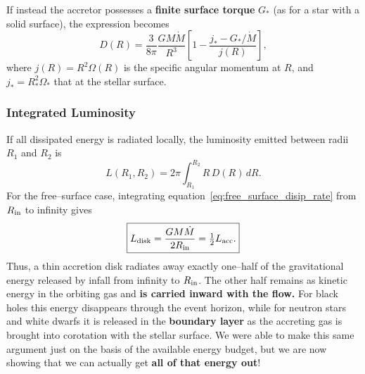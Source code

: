 \vspace{0.3cm}
\noindent
If instead the accretor possesses a \textbf{finite surface torque} $G_*$ (as for a star with a solid surface), 
the expression becomes
\begin{equation}
    D(R) = \frac{3}{8\pi}\frac{GM\dot{M}}{R^3}
    \left[1 - \frac{j_* - G_*/\dot{M}}{j(R)}\right],
\end{equation}
where $j(R)=R^2\Omega(R)$ is the specific angular momentum at $R$, and 
$j_*=R_*^2\Omega_*$ that at the stellar surface.
\vspace{0.4cm}
\subsubsection*{Integrated Luminosity}
If all dissipated energy is radiated locally, the luminosity emitted between radii $R_1$ and $R_2$ is
\begin{equation}
    L(R_1,R_2) = 2\pi \int_{R_1}^{R_2} R\,D(R)\,dR.
\end{equation}
For the free--surface case, integrating equation~\eqref{eq:free_surface_disip_rate} from 
$R_{\rm in}$ to infinity gives
\begin{equation}
    \label{L_disk}
    \boxed{
    L_{\rm disk} = \frac{GM\dot{M}}{2R_{\rm in}} = \tfrac{1}{2}L_{\rm acc}.
    }
\end{equation}
Thus, a thin accretion disk radiates away exactly one--half of the gravitational energy 
released by infall from infinity to $R_{\rm in}$.  
The other half remains as kinetic energy in the orbiting gas and \textbf{is carried inward with the flow.  }
For black holes this energy disappears through the event horizon, while for neutron stars 
and white dwarfs it is released in the \textbf{boundary layer} as the accreting gas is brought into 
corotation with the stellar surface. We were able to make this same argument just on the basis of the available energy budget, but we are now showing that we can actually get \textbf{all of that energy out}!

\vspace{0.4cm}
